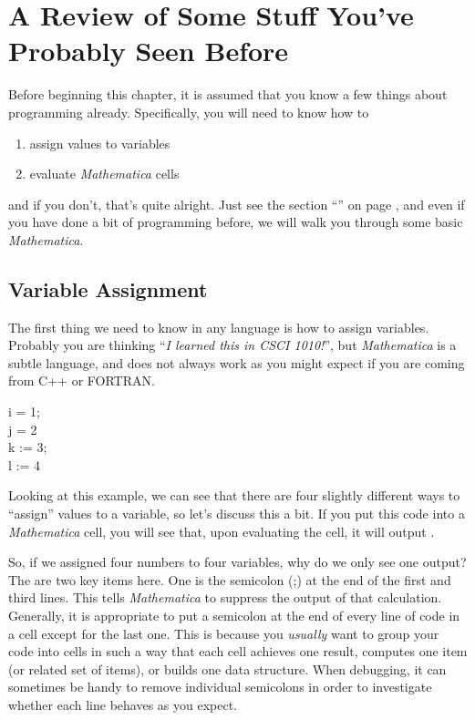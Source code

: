 \chapter[Stuff You've Seen Before]{A Review of Some Stuff You've Probably Seen Before}
\label{chap:SeenBefore}

Before beginning this chapter, it is assumed that you know a few things about programming already. Specifically, you will need to know how to
\begin{enumerate}
	   \item assign values to variables
	   \item evaluate \emph{Mathematica} cells
\end{enumerate}
and if you don't, that's quite alright. Just see the section ``\emph{}'' on page \pageref{chap:Prelim}, and even if you have done a bit of programming before, we will walk you through some basic \emph{Mathematica}.

\section{Variable Assignment}
The first thing we need to know in any language is how to assign variables. Probably you are thinking ``\emph{I learned this in CSCI 1010!}'', but \emph{Mathematica} is a subtle language, and does not always work as you might expect if you are coming from C++ or FORTRAN.

\begin{code}
	i = 1;\\
	j = 2\\
	k := 3;\\
	l := 4
\end{code}

Looking at this example, we can see that there are four slightly different ways to ``assign'' values to a variable, so let's discuss this a bit. If you put this code into a \emph{Mathematica} cell, you will see that, upon evaluating the cell, it will output .

So, if we assigned four numbers to four variables, why do we only see one output? The are two key items here. One is the semicolon (;) at the end of the first and third lines. This tells \emph{Mathematica} to suppress the output of that calculation. Generally, it is appropriate to put a semicolon at the end of every line of code in a cell except for the last one. This is because you \emph{usually} want to group your code into cells in such a way that each cell achieves one result, computes one item (or related set of items), or builds one data structure. When debugging, it can sometimes be handy to remove individual semicolons in order to investigate whether each line behaves as you expect.

